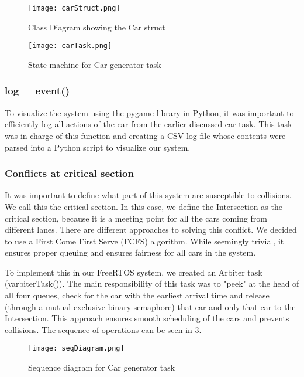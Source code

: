 \documentclass[conference]{IEEEtran}
\begin{document}
\begin{figure}[h!]
    \centering
    \texttt{[image: carStruct.png]}
    \caption{Class Diagram showing the Car struct}
    \label{fig:carStruct}
\end{figure}

\begin{figure}[h!]
  \centering
  \texttt{[image: carTask.png]}
  \caption{State machine for Car generator task}
  \label{fig:carGnerator}
\end{figure}


\subsubsection{log\_\_event()}
To visualize the system using the pygame library in Python, it was important to efficiently log all actions of the car from the earlier discussed car task. This task was in charge of this function and creating a CSV log file whose contents were parsed into a Python script to visualize our system.

\subsubsection{Conflicts at critical section}
It was important to define what part of this system are susceptible to collisions. We call this the critical section. In this case, we define the Intersection as the critical section, because it is a meeting point for all the cars coming from different lanes. There are different approaches to solving this conflict. We decided to use a First Come First Serve (FCFS) algorithm. While seemingly trivial, it ensures proper queuing and ensures fairness for all cars in the system.

To implement this in our FreeRTOS system, we created an Arbiter task (varbiterTask()). The main responsibility of this task was to "peek" at the head of all four queues, check for the car with the earliest arrival time and release (through a mutual exclusive binary semaphore) that car and only that car to the Intersection.  This approach ensures smooth scheduling of the cars and prevents collisions. 
The sequence of operations can be seen in \ref{fig:arbiter-seq}.

\begin{figure}[h!]
  \centering
  \texttt{[image: seqDiagram.png]}
  \caption{Sequence diagram for Car generator task}
  \label{fig:arbiter-seq}
\end{figure}
\end{document}

